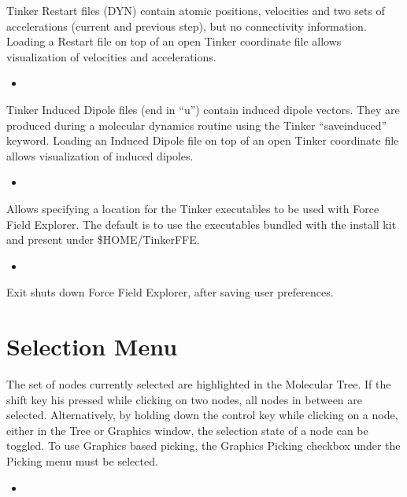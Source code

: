 \documentclass[letterpaper,11pt,english]{sphinxmanual}
\begin{document}
\sphinxAtStartPar
Tinker Restart files (DYN) contain atomic positions, velocities and two sets of accelerations (current and previous step), but no connectivity information. Loading a Restart file on top of an open Tinker coordinate file allows visualization of velocities and accelerations.
\begin{itemize}
\item {} 
\sphinxAtStartPar
{}

\end{itemize}

\sphinxAtStartPar
Tinker Induced Dipole files (end in “u”) contain induced dipole vectors. They are produced during a molecular dynamics routine using the Tinker “save\sphinxhyphen{}induced” keyword. Loading an Induced Dipole file on top of an open Tinker coordinate file allows visualization of induced dipoles.
\begin{itemize}
\item {} 
\sphinxAtStartPar
{}

\end{itemize}

\sphinxAtStartPar
Allows specifying a location for the Tinker executables to be used with Force Field Explorer. The default is to use the executables bundled with the install kit and present under \$HOME/Tinker\sphinxhyphen{}FFE.
\begin{itemize}
\item {} 
\sphinxAtStartPar
{}

\end{itemize}

\sphinxAtStartPar
Exit shuts down Force Field Explorer, after saving user preferences.


\section{Selection Menu}
\label{\detokenize{text/menus:selection-menu}}
\sphinxAtStartPar
The set of nodes currently selected are highlighted in the Molecular Tree. If the shift key his pressed while clicking on two nodes, all nodes in between are selected. Alternatively, by holding down the control key while clicking on a node, either in the Tree or Graphics window, the selection state of a node can be toggled. To use Graphics based picking, the Graphics Picking checkbox under the Picking menu must be selected.
\begin{itemize}
\item {} 
\sphinxAtStartPar
{}

\end{itemize}
\end{document}
